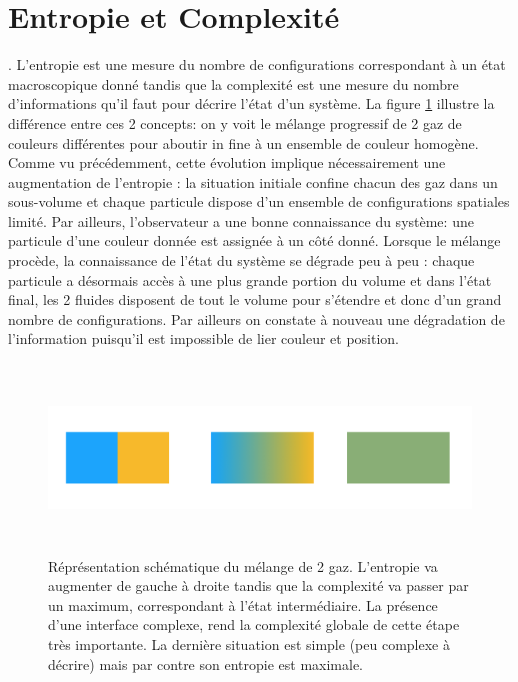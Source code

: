 \section{Entropie et Complexité}
. L'entropie est une mesure du nombre de configurations correspondant à un état macroscopique donné tandis que la complexité est une mesure du nombre d'informations qu'il faut pour décrire l'état d'un système. La figure \ref{f:melange} illustre la différence entre ces 2 concepts: on y voit le mélange progressif de 2 gaz de couleurs différentes pour aboutir in fine à un ensemble de couleur homogène. Comme vu précédemment, cette évolution implique nécessairement une augmentation de l'entropie : la situation initiale confine chacun des gaz dans un sous-volume et chaque particule dispose d'un ensemble de configurations spatiales limité. Par ailleurs, l'observateur a une bonne connaissance du système: une particule d'une couleur donnée est assignée à un côté donné. Lorsque le mélange procède, la connaissance de l'état du système se dégrade peu à peu : chaque particule a désormais accès à une plus grande portion du volume et dans l'état final, les 2 fluides disposent de tout le volume pour s'étendre et donc d'un grand nombre de configurations. Par ailleurs on constate à nouveau une dégradation de l'information puisqu'il est impossible de lier couleur et position.
\begin{figure}[htbp]
	\centering
		\includegraphics[height=5cm]{figs/melange.png}
		\caption[Entropie \& Complexité]{Réprésentation schématique du mélange de 2 gaz. L'entropie va augmenter de gauche à droite tandis que la complexité va passer par un maximum, correspondant à l'état intermédiaire. La présence d'une interface complexe, rend la complexité globale de cette étape très importante. La dernière situation est simple (peu complexe à décrire) mais par contre son entropie est maximale.}
	\label{f:melange}
\end{figure}

